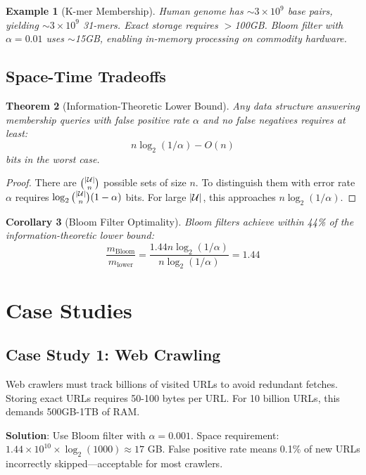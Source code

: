 \documentclass[11pt]{article}
\newtheorem{theorem}{Theorem}[section]
\newtheorem{corollary}[theorem]{Corollary}
\newtheorem{example}[theorem]{Example}
\begin{document}
\begin{example}[K-mer Membership]
Human genome has $\sim 3 \times 10^9$ base pairs, yielding $\sim 3 \times 10^9$ 31-mers. Exact storage requires $>$100GB. Bloom filter with $\alpha = 0.01$ uses $\sim$15GB, enabling in-memory processing on commodity hardware.
\end{example}

\subsection{Space-Time Tradeoffs}

\begin{theorem}[Information-Theoretic Lower Bound]
Any data structure answering membership queries with false positive rate $\alpha$ and no false negatives requires at least:
\[
n\log_2(1/\alpha) - O(n)
\]
bits in the worst case.
\end{theorem}

\begin{proof}
There are $\binom{|\mathcal{U}|}{n}$ possible sets of size $n$. To distinguish them with error rate $\alpha$ requires $\log_2\binom{|\mathcal{U}|}{n}(1-\alpha)$ bits. For large $|\mathcal{U}|$, this approaches $n\log_2(1/\alpha)$.
\end{proof}

\begin{corollary}[Bloom Filter Optimality]
Bloom filters achieve within 44\% of the information-theoretic lower bound:
\[
\frac{m_{\text{Bloom}}}{m_{\text{lower}}} = \frac{1.44n\log_2(1/\alpha)}{n\log_2(1/\alpha)} = 1.44
\]
\end{corollary}

\section{Case Studies}

\subsection{Case Study 1: Web Crawling}

Web crawlers must track billions of visited URLs to avoid redundant fetches. Storing exact URLs requires 50-100 bytes per URL. For 10 billion URLs, this demands 500GB-1TB of RAM.

\textbf{Solution}: Use Bloom filter with $\alpha = 0.001$. Space requirement: $1.44 \times 10^{10} \times \log_2(1000) \approx 17$ GB. False positive rate means 0.1\% of new URLs incorrectly skipped---acceptable for most crawlers.
\end{document}

